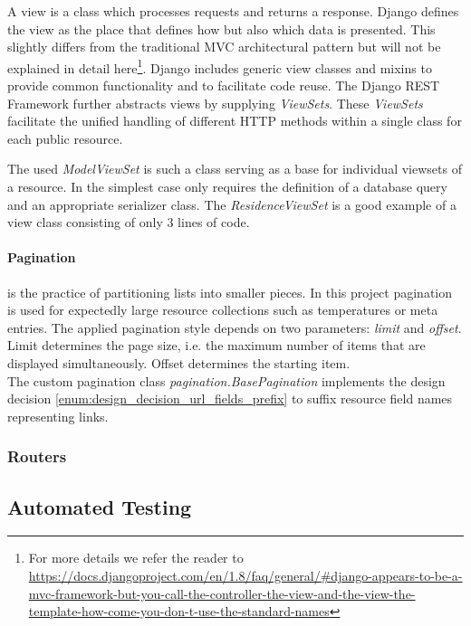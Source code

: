 A view is a class which processes requests and returns a response.
Django defines the view as the place that defines how but also which data is presented.
This slightly differs from the traditional MVC architectural pattern but will not be explained in detail here\footnote{For more details we refer the reader to \url{https://docs.djangoproject.com/en/1.8/faq/general/\#django-appears-to-be-a-mvc-framework-but-you-call-the-controller-the-view-and-the-view-the-template-how-come-you-don-t-use-the-standard-names}}.
Django includes generic view classes and mixins to provide common functionality and to facilitate code reuse.
The Django REST Framework further abstracts views by supplying \emph{ViewSets}.
These \emph{ViewSets} facilitate the unified handling of different HTTP methods within a single class for each public resource.

The used \emph{ModelViewSet} is such a class serving as a base for individual viewsets of a resource.
In the simplest case only requires the definition of a database query and an appropriate serializer class.
The \emph{ResidenceViewSet} is a good example of a view class consisting of only 3 lines of code.

\paragraph{Pagination} is the practice of partitioning lists into smaller pieces.
In this project pagination is used for expectedly large resource collections such as temperatures or meta entries.
The applied pagination style depends on two parameters: \emph{limit} and \emph{offset}.
Limit determines the page size, i.e. the maximum number of items that are displayed simultaneously.
Offset determines the starting item.\\
The custom pagination class \emph{pagination.BasePagination} implements the design decision \ref{enum:design_decision_url_fields_prefix} to suffix resource field names representing links.

\subsubsection{Routers}
\label{sec:server_infrastructure_routers}



\subsection{Automated Testing}


